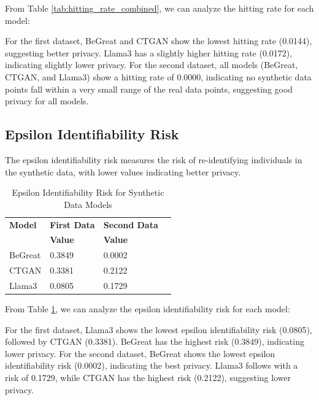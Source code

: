 From Table \ref{tab:hitting_rate_combined},  we can analyze the hitting rate for each model:

For the first dataset, BeGreat and CTGAN show the lowest hitting rate (0.0144), suggesting better privacy. Llama3 has a slightly higher hitting rate (0.0172), indicating slightly lower privacy.
For the second dataset, all models (BeGreat, CTGAN, and Llama3) show a hitting rate of 0.0000, indicating no synthetic data points fall within a very small range of the real data points, suggesting good privacy for all models.




\subsection{Epsilon Identifiability Risk}

The epsilon identifiability risk measures the risk of re-identifying individuals in the synthetic data, with lower values indicating better privacy.

\begin{table}[H]
\centering
\caption{Epsilon Identifiability Risk for Synthetic Data Models}
\label{tab:epsilon_identifiability_risk_combined}
\begin{tabularx}{\textwidth}{l*{5}{X}}
    \toprule
    \textbf{Model} & \multicolumn{2}{c}{\textbf{First Data}} & \multicolumn{2}{c}{\textbf{Second Data}} \\
    \cmidrule(lr){2-3} \cmidrule(lr){4-5}
    & \textbf{Value} & & \textbf{Value} \\
    \midrule
    BeGreat & 0.3849 & & 0.0002 \\
    CTGAN & 0.3381 & & 0.2122 \\
    Llama3 & 0.0805 & & 0.1729 \\
    \bottomrule
\end{tabularx}
\end{table}

From Table \ref{tab:epsilon_identifiability_risk_combined}, we can analyze the epsilon identifiability risk for each model:

For the first dataset, Llama3 shows the lowest epsilon identifiability risk (0.0805), followed by CTGAN (0.3381). BeGreat has the highest risk (0.3849), indicating lower privacy.
For the second dataset, BeGreat shows the lowest epsilon identifiability risk (0.0002), indicating the best privacy. Llama3 follows with a risk of 0.1729, while CTGAN has the highest risk (0.2122), suggesting lower privacy.





